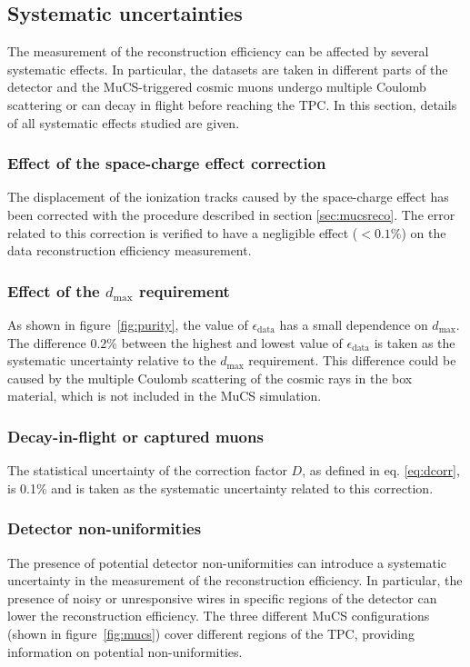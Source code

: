\documentclass[a4paper,11pt]{article}
\begin{document}
\subsection{Systematic uncertainties}\label{sec:sys}
The measurement of the reconstruction efficiency can be affected by several systematic effects. In particular, the datasets are taken in different parts of the detector and the MuCS-triggered cosmic muons undergo multiple Coulomb scattering or can decay in flight before reaching the TPC. In this section, details of all systematic effects studied are given.

\subsubsection{Effect of the space-charge effect correction}
The displacement of the ionization tracks caused by the space-charge effect has been corrected with the procedure described in section \ref{sec:mucsreco}. The error related to this correction is verified to have a negligible effect ($<0.1\%$) on the data reconstruction efficiency measurement.

\subsubsection{Effect of the $d_{\mathrm{max}}$ requirement}

As shown in figure~\ref{fig:purity}, the value of $\epsilon_{\mathrm{data}}$ has a small dependence on $d_{\mathrm{max}}$. The difference $0.2\%$ between the highest and lowest value of $\epsilon_{\mathrm{data}}$ is taken as the systematic uncertainty relative to the $d_{\mathrm{max}}$ requirement. This difference could be caused by the multiple Coulomb scattering of the cosmic rays in the box material, which is not included in the MuCS simulation.

\subsubsection{Decay-in-flight or captured muons}\label{sec:dif}
The statistical uncertainty of the correction factor $D$, as defined in eq. \eqref{eq:dcorr}, is 0.1\% and is taken as the systematic uncertainty related to this correction.

\subsubsection{Detector non-uniformities}\label{sec:wires}
The presence of potential detector non-uniformities can introduce a systematic uncertainty in the measurement of the reconstruction efficiency. In particular, the presence of noisy or unresponsive wires in specific regions of the detector can lower the reconstruction efficiency. The three different MuCS configurations (shown in figure~\ref{fig:mucs}) cover different regions of the TPC, providing information on potential non-uniformities.
\end{document}
